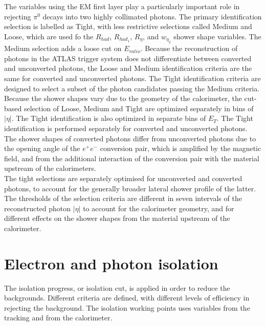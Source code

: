 \documentclass[a4paper, oneside]{book}
\begin{document}
			The variables using the EM first layer play a particularly important role in rejecting $\pi^0$ decays into
			two highly collimated photons. The primary identification selection is labelled as Tight, with less restrictive selections called
			Medium and Loose, which are used fo the $R_{had}$, $R_{had_1}$, $R_{\eta}$, and $w_{\eta_2}$ shower shape variables. The Medium selection adds a loose cut on $E_{ratio}$. Because the reconstruction of photons in the ATLAS trigger system does not differentiate between converted and unconverted photons, the Loose and Medium identification criteria are the same for converted
			and unconverted photons. The Tight identification criteria are designed to select a subset of the photon candidates passing the Medium criteria.\\
			Because the shower shapes vary due to the geometry of the calorimeter, the cut-based selection of Loose, Medium and Tight
			are optimized separately in bins of $|\eta|$. The Tight identification is also optimized in separate bins of $E_T$. The Tight identification is performed separately for converted and
			unconverted photons. The shower shapes of converted photons differ from unconverted photons due to the opening angle of the $e^{+}e^{-}$ conversion pair, which is amplified by the magnetic field, and from the additional interaction of the conversion pair with the material upstream of the calorimeters. \\
			The tight selections are separately optimised for unconverted and converted photons, to account for the generally broader lateral shower profile of the latter. The thresholds of the selection criteria are different in seven intervals of the reconstructed photon $|\eta|$ to account for the calorimeter geometry, and for different effects on the shower shapes from the material upstream of the calorimeter.
	
		\section{Electron and photon isolation}\label{section:Iso}
		The isolation progress, or isolation cut, is applied in order to reduce the backgrounds. Different criteria are defined, with different levels
		of efficiency in rejecting the background. The isolation working points uses variables from the tracking and from the calorimeter. \cite{El ph isol}
		
\end{document}
